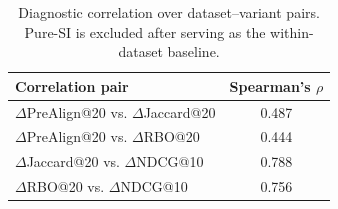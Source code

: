 \begin{table}[!t]
\centering
\caption{Diagnostic correlation over dataset--variant pairs. Pure-SI is excluded after serving as the within-dataset baseline.}
\label{tab:diagnostic_correlation}
\small
\setlength{\tabcolsep}{7pt}
\renewcommand{\arraystretch}{1.06}
\begin{tabular}{lc}
\toprule
Correlation pair & Spearman's $\rho$ \\
\midrule
$\Delta$PreAlign@20 vs. $\Delta$Jaccard@20 & 0.487 \\
$\Delta$PreAlign@20 vs. $\Delta$RBO@20 & 0.444 \\
$\Delta$Jaccard@20 vs. $\Delta$NDCG@10 & 0.788 \\
$\Delta$RBO@20 vs. $\Delta$NDCG@10 & 0.756 \\
\bottomrule
\end{tabular}
\end{table}
